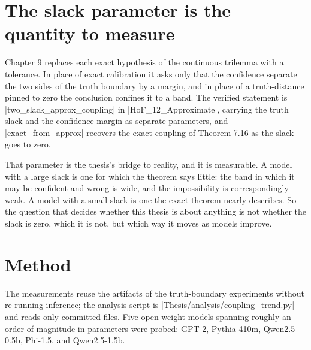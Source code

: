 \documentclass{memoir}
\begin{document}
\section{The slack parameter is the quantity to measure}\label{Two--Schemas--of--Impossibility-005F-005F-005F--Machine--Checked--Limits--of--Trustworthy--Machine--Learning-005F-005F-005F--and--Why--They--Tighten--with--Capability----Does--the--Constraint--Bind-005F-005F-005F--Measurements--on--Five--Models----The--slack--parameter--is--the--quantity--to--measure}

Chapter 9 replaces each exact hypothesis of the continuous trilemma with a
tolerance. In place of exact calibration it asks only that the confidence
separate the two sides of the truth boundary by a margin, and in place of a
truth-distance pinned to zero the conclusion confines it to a band. The verified
statement is \LeanVerb|two_slack_approx_coupling| in \LeanVerb|HoF_12_Approximate|, carrying the
truth slack and the confidence margin as separate parameters, and
\LeanVerb|exact_from_approx| recovers the exact coupling of Theorem 7.16 as the slack
goes to zero.

That parameter is the thesis's bridge to reality, and it is measurable. A model
with a large slack is one for which the theorem says little: the band in which
it may be confident and wrong is wide, and the impossibility is correspondingly
weak. A model with a small slack is one the exact theorem nearly describes. So
the question that decides whether this thesis is about anything is not whether
the slack is zero, which it is not, but which way it moves as models improve.



\section{Method}\label{Two--Schemas--of--Impossibility-005F-005F-005F--Machine--Checked--Limits--of--Trustworthy--Machine--Learning-005F-005F-005F--and--Why--They--Tighten--with--Capability----Does--the--Constraint--Bind-005F-005F-005F--Measurements--on--Five--Models----Method}

The measurements reuse the artifacts of the truth-boundary experiments without
re-running inference; the analysis script is \LeanVerb|Thesis/analysis/coupling_trend.py|
and reads only committed files. Five open-weight models spanning roughly an
order of magnitude in parameters were probed: GPT-2, Pythia-410m,
Qwen2.5-0.5b, Phi-1.5, and Qwen2.5-1.5b.
\end{document}
